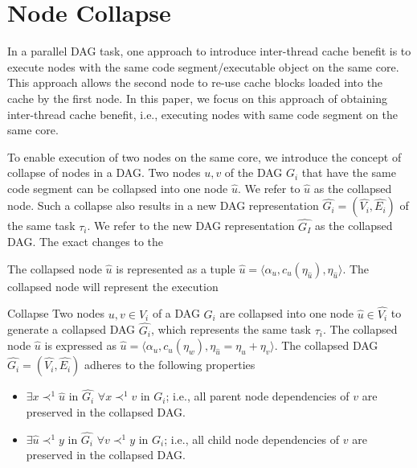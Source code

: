 \section{Node Collapse}
In a parallel DAG task, one approach to introduce inter-thread cache benefit is to execute nodes with the same code segment/executable object on the same core. This approach allows the second node to re-use cache blocks loaded into the cache by the first node. In this paper, we focus on this approach of obtaining inter-thread cache benefit, i.e., executing nodes with same code segment on the same core. 

To enable execution of two nodes on the same core, we introduce the concept of collapse of nodes in a DAG. Two nodes $u,v$ of the DAG $G_i$ that have the same code segment can be collapsed into one node $\hat{u}$. We refer to $\hat{u}$ as the collapsed node. Such a collapse also results in a new DAG representation $\hat{G_i} = (\hat{V_i}, \hat{E_i})$ of the same task $\tau_i$.  We refer to the new DAG representation $\hat{G_I}$ as the collapsed DAG. The exact changes to the 

 The collapsed node $\hat{u}$ is represented as a tuple $\hat{u} = \langle \alpha_u , c_u(\eta_{\hat{u}}), \eta_{\hat{u}} \rangle$. The collapsed node will represent the execution
  
 \begin{definition}{Collapse}
Two nodes $u,v \in V_i$ of a DAG $G_i$ are collapsed into one node $\hat{u} \in \hat{V_i}$ to generate a collapsed DAG $\hat{G_i}$, which represents the same task $\tau_i$. The collapsed node $\hat{u}$ is expressed as $\hat{u} = \langle \alpha_u , c_u(\eta_w), \eta_{\hat{u}} = \eta_u+\eta_v \rangle$. The collapsed DAG $\hat{G_i} = (\hat{V_i}, \hat{E_i})$ adheres to the following properties
\begin{itemize}
\item $\exists x \prec^{1} \hat{u}$ in $\hat{G_i}$ $\forall x \prec^1 v$ in $G_i$; i.e., all parent node dependencies of $v$ are preserved in the collapsed DAG.
\item $\exists \hat{u} \prec^{1} y$ in $\hat{G_i}$ $\forall v \prec^1 y$ in $G_i$; i.e., all child node dependencies of $v$ are preserved in the collapsed DAG.
\end{itemize}
 \end{definition}

